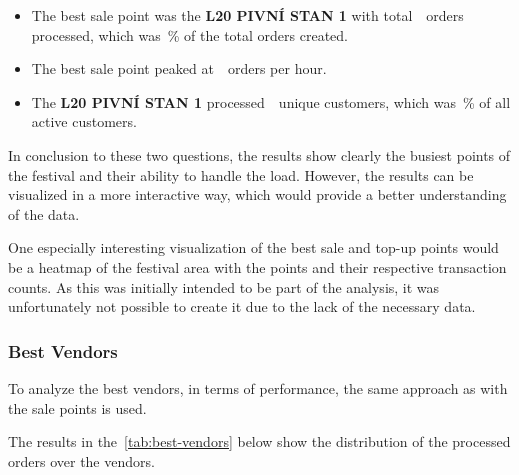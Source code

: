 \begin{keytakeaways}
	\begin{itemize}
		\item The best sale point was the \textbf{L20 PIVNÍ STAN 1} with total~~orders processed, which was~\% of the total orders created.
		\item The best sale point peaked at~~orders per hour.
		\item The \textbf{L20 PIVNÍ STAN 1} processed~~unique customers, which was~\% of all active customers.
	\end{itemize}
\end{keytakeaways}

In conclusion to these two questions, the results show clearly the busiest points of the festival and their ability to handle the load.
However, the results can be visualized in a more interactive way, which would provide a better understanding of the data.

One especially interesting visualization of the best sale and top-up points would be a heatmap of the festival area with the points and their respective transaction counts.
As this was initially intended to be part of the analysis, it was unfortunately not possible to create it due to the lack of the necessary data.


\subsubsection{Best Vendors}
\label{subsubsec:analysis-best-vendors}

To analyze the best vendors, in terms of performance, the same approach as with the sale points is used.


The results in the~\autoref{tab:best-vendors} below show the distribution of the processed orders over the vendors.

